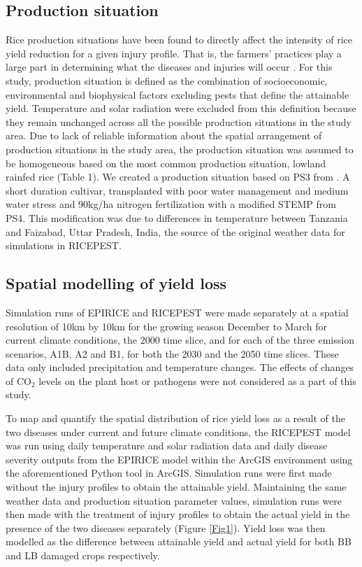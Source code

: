     \subsection{Production situation}
    \label{production_situation}
    Rice production situations have been found to directly affect the intensity of rice yield reduction for a given injury profile. That is, the farmers' practices play a large part in determining what the diseases and injuries will occur \citep{Savary2000}. For this study, production situation is defined as the combination of socioeconomic, environmental and biophysical factors excluding pests that define the attainable yield. Temperature and solar radiation were excluded from this definition because they remain unchanged across all the possible production situations in the study area. Due to lack of reliable information about the spatial arrangement of production situations in the study area, the production situation was assumed to be homogeneous based on the most common production situation, lowland rainfed rice \citep{Diagne2013} (Table 1). We created a production situation based on PS3 from \citep{Willocquet2004}. A short duration cultivar, transplanted with poor water management and medium water stress and 90kg/ha nitrogen fertilization with a modified STEMP from PS4. This modification was due to differences in temperature between Tanzania and Faizabad, Uttar Pradesh, India, the source of the original weather data for simulations in RICEPEST.
    
    \subsection{Spatial modelling of yield loss}
    \label{modelling_yield_loss}
    Simulation runs of EPIRICE and RICEPEST were made separately at a spatial resolution of 10km by 10km for the growing season December to March for current climate conditions, the 2000 time slice, and for each of the three emission scenarios, A1B, A2 and B1, for both the 2030 and the 2050 time slices. These data only included precipitation and temperature changes. The effects of changes of CO$_{2}$ levels on the plant host or pathogens were not considered as a part of this study.
    
    To map and quantify the spatial distribution of rice yield loss as a result of the two diseases under current and future climate conditions, the RICEPEST model was run using daily temperature and solar radiation data and daily disease severity outputs from the EPIRICE model within the ArcGIS environment using the aforementioned Python tool in ArcGIS. Simulation runs were first made without the injury profiles to obtain the attainable yield. Maintaining the same weather data and production situation parameter values, simulation runs were then made with the treatment of injury profiles to obtain the actual yield in the presence of the two diseases separately (Figure \ref{Fig1}). Yield loss was then modelled as the difference between attainable yield and actual yield for both BB and LB damaged crops respectively.
    
